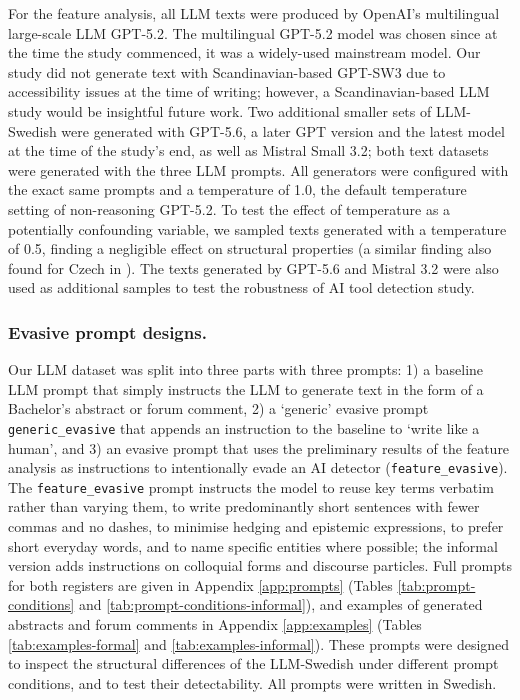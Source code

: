 \documentclass[thesis]{cluu}
\providecommand{\DIFadd}[1]{\texorpdfstring{\highLight[yellow]{#1}}{#1}} %
\providecommand{\DIFadd}[1]{#1} %
\providecommand{\DIFdel}[1]{} %
\providecommand{\DIFaddbegin}{} %
\providecommand{\DIFaddend}{} %
\providecommand{\DIFdelbegin}{} %
\providecommand{\DIFdelend}{} %
\begin{document}
For the feature analysis, all LLM texts were produced by OpenAI's multilingual large-scale LLM GPT-5.2. The multilingual GPT-5.2 model was chosen since at the time the study commenced, it was a widely-used mainstream model. Our study did not generate text with Scandinavian-based GPT-SW3 due to accessibility issues at the time of writing; however, a Scandinavian-based LLM study would be insightful future work. Two additional smaller sets of LLM-Swedish were generated with GPT-5.6, a later GPT version and the latest model at the time of the study's end, as well as Mistral Small 3.2; both text datasets were generated with the three LLM prompts. All generators were configured with the exact same prompts and a temperature of 1.0, the default temperature setting of non-reasoning GPT-5.2. To test the effect of temperature as a potentially confounding variable, we sampled texts generated with a temperature of 0.5, finding a negligible effect on structural properties (a similar finding also found for Czech in \DIFdelbegin \DIFdel{\cite{milicka2024benchmark}}\DIFdelend \DIFaddbegin \DIFadd{\textcite{milicka2024benchmark}}\DIFaddend ). The texts generated by GPT-5.6 and Mistral 3.2 were also used as additional samples to test the robustness of AI tool detection study.

\subsubsection{Evasive prompt designs.}
Our LLM dataset was split into three parts with three prompts: 1) a baseline
LLM prompt that simply instructs the LLM to generate text in the form of a
Bachelor's abstract or forum comment, 2) a `generic' evasive prompt
\texttt{generic\_evasive} that appends an instruction to the baseline to
`write like a human', and 3) an evasive prompt that uses the preliminary
results of the feature analysis as instructions to intentionally evade an AI
detector (\texttt{feature\_evasive}). The \texttt{feature\_evasive} prompt
instructs the model to reuse key terms verbatim rather than varying them, to
write predominantly short sentences with fewer commas and no dashes, to
minimise hedging and epistemic expressions, to prefer short everyday words,
and to name specific entities where possible; the informal version adds
instructions on colloquial forms and discourse particles. Full prompts for
both registers are given in Appendix \ref{app:prompts}
(Tables \ref{tab:prompt-conditions} and \ref{tab:prompt-conditions-informal}),
and examples of generated abstracts and forum comments in Appendix
\ref{app:examples} (Tables \ref{tab:examples-formal} and
\ref{tab:examples-informal}). These prompts were designed to inspect the
structural differences of the LLM-Swedish under different prompt conditions,
and to test their detectability. All prompts were written in Swedish.
\end{document}
